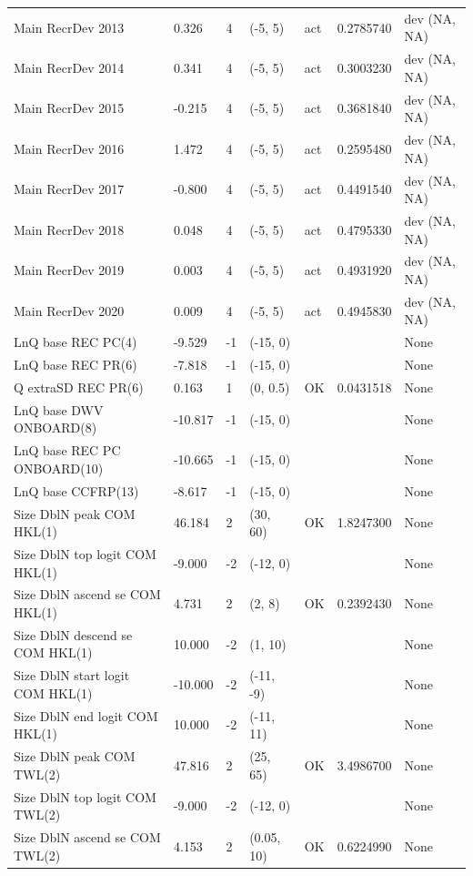\documentclass[11pt,
  english,
]{article}
\begin{document}
\begin{landscape}
\begin{longtable}[t]{lllllll}
\addlinespace
Main RecrDev 2013 & 0.326 & 4 & (-5, 5) & act & 0.2785740 & dev (NA, NA)\\
Main RecrDev 2014 & 0.341 & 4 & (-5, 5) & act & 0.3003230 & dev (NA, NA)\\
Main RecrDev 2015 & -0.215 & 4 & (-5, 5) & act & 0.3681840 & dev (NA, NA)\\
Main RecrDev 2016 & 1.472 & 4 & (-5, 5) & act & 0.2595480 & dev (NA, NA)\\
Main RecrDev 2017 & -0.800 & 4 & (-5, 5) & act & 0.4491540 & dev (NA, NA)\\
\addlinespace
Main RecrDev 2018 & 0.048 & 4 & (-5, 5) & act & 0.4795330 & dev (NA, NA)\\
Main RecrDev 2019 & 0.003 & 4 & (-5, 5) & act & 0.4931920 & dev (NA, NA)\\
Main RecrDev 2020 & 0.009 & 4 & (-5, 5) & act & 0.4945830 & dev (NA, NA)\\
LnQ base REC PC(4) & -9.529 & -1 & (-15, 0) &  &  & None\\
LnQ base REC PR(6) & -7.818 & -1 & (-15, 0) &  &  & None\\
\addlinespace
Q extraSD REC PR(6) & 0.163 & 1 & (0, 0.5) & OK & 0.0431518 & None\\
LnQ base DWV ONBOARD(8) & -10.817 & -1 & (-15, 0) &  &  & None\\
LnQ base REC PC ONBOARD(10) & -10.665 & -1 & (-15, 0) &  &  & None\\
LnQ base CCFRP(13) & -8.617 & -1 & (-15, 0) &  &  & None\\
Size DblN peak COM HKL(1) & 46.184 & 2 & (30, 60) & OK & 1.8247300 & None\\
\addlinespace
Size DblN top logit COM HKL(1) & -9.000 & -2 & (-12, 0) &  &  & None\\
Size DblN ascend se COM HKL(1) & 4.731 & 2 & (2, 8) & OK & 0.2392430 & None\\
Size DblN descend se COM HKL(1) & 10.000 & -2 & (1, 10) &  &  & None\\
Size DblN start logit COM HKL(1) & -10.000 & -2 & (-11, -9) &  &  & None\\
Size DblN end logit COM HKL(1) & 10.000 & -2 & (-11, 11) &  &  & None\\
\addlinespace
Size DblN peak COM TWL(2) & 47.816 & 2 & (25, 65) & OK & 3.4986700 & None\\
Size DblN top logit COM TWL(2) & -9.000 & -2 & (-12, 0) &  &  & None\\
Size DblN ascend se COM TWL(2) & 4.153 & 2 & (0.05, 10) & OK & 0.6224990 & None\\

\end{longtable}
\end{landscape}
\end{document}
